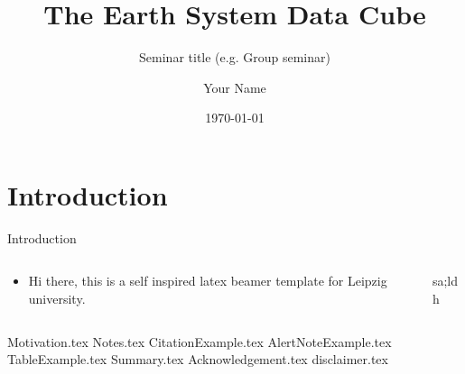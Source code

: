 \documentclass[aspectratio=\BeamerAspectRatio]{beamer}
\title[ESDC]{The Earth System Data Cube}
\subtitle[Group seminar]{Seminar title (e.g. Group seminar)}
\author{Your Name}
\institute{
  RSC4Earth\\
  Fakult\"at f\"ur Chemie und und Mineralogie\\
  Universit\"at Leipzig}
\date{\today}
\begin{document}
\maketitlepage %
\maketableofcontents %
\makesectionpopup %

\section[Intro]{Introduction}
\begin{frame}{Introduction}
  
  \begin{columns}
    \begin{column}{0.5\textwidth}
      \begin{itemize}
      \item Hi there, this is a self inspired latex beamer template for Leipzig
        university.
      \end{itemize}
    \end{column}
    \begin{column}{0.5\textwidth}
      sa;ldh
    \end{column}
  \end{columns}
\end{frame}

{Motivation.tex}
{Notes.tex}
{CitationExample.tex}
{AlertNoteExample.tex}
{TableExample.tex}
{Summary.tex}
{Acknowledgement.tex}
{disclaimer.tex}
\end{document}
